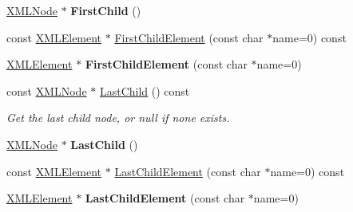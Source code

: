 \begin{DoxyCompactItemize}
\mbox{\label{classCPlantBox_1_1tinyxml2_1_1XMLNode_a20cda6a4b661d869adee39f7b4936978}} 
\hyperlink{classCPlantBox_1_1tinyxml2_1_1XMLNode}{X\+M\+L\+Node} $\ast$ {\bfseries First\+Child} ()
\item 
const \hyperlink{classCPlantBox_1_1tinyxml2_1_1XMLElement}{X\+M\+L\+Element} $\ast$ \hyperlink{classCPlantBox_1_1tinyxml2_1_1XMLNode_a47764229f183f01c147e5d0b0e2534a5}{First\+Child\+Element} (const char $\ast$name=0) const
\item 
\mbox{\label{classCPlantBox_1_1tinyxml2_1_1XMLNode_ae83773aa426950d2f9c4e236291600c3}} 
\hyperlink{classCPlantBox_1_1tinyxml2_1_1XMLElement}{X\+M\+L\+Element} $\ast$ {\bfseries First\+Child\+Element} (const char $\ast$name=0)
\item 
\mbox{\label{classCPlantBox_1_1tinyxml2_1_1XMLNode_a5325038c799ad491d84e198724267dee}} 
const \hyperlink{classCPlantBox_1_1tinyxml2_1_1XMLNode}{X\+M\+L\+Node} $\ast$ \hyperlink{classCPlantBox_1_1tinyxml2_1_1XMLNode_a5325038c799ad491d84e198724267dee}{Last\+Child} () const
\begin{DoxyCompactList}\small\item\em Get the last child node, or null if none exists. \end{DoxyCompactList}\item 
\mbox{\label{classCPlantBox_1_1tinyxml2_1_1XMLNode_a237a351b714112b575ef65a120c138ad}} 
\hyperlink{classCPlantBox_1_1tinyxml2_1_1XMLNode}{X\+M\+L\+Node} $\ast$ {\bfseries Last\+Child} ()
\item 
const \hyperlink{classCPlantBox_1_1tinyxml2_1_1XMLElement}{X\+M\+L\+Element} $\ast$ \hyperlink{classCPlantBox_1_1tinyxml2_1_1XMLNode_a50ef5d07c0fcf536871b7296f6d77518}{Last\+Child\+Element} (const char $\ast$name=0) const
\item 
\mbox{\label{classCPlantBox_1_1tinyxml2_1_1XMLNode_ab46ed09d287288d57be8c38ea0c77f6b}} 
\hyperlink{classCPlantBox_1_1tinyxml2_1_1XMLElement}{X\+M\+L\+Element} $\ast$ {\bfseries Last\+Child\+Element} (const char $\ast$name=0)
\item 
\mbox{\label{classCPlantBox_1_1tinyxml2_1_1XMLNode_ae6560a99052e567fc52df3c7f53186d0}} 

\end{DoxyCompactItemize}
